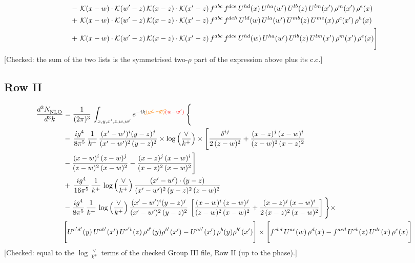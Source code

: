 \documentclass[9pt]{article}
\numberwithin{equation}{section}
\begin{document}
\begin{align}
&-\,\mathcal{K}(x-w)\cdot\mathcal{K}(w'-z)\,\mathcal{K}(x-z)\cdot\mathcal{K}(x'-z)\,f^{abc}\,f^{dce}\,U^{hd}(x)\,U^{ha}(w')\,U^{lb}(z)\,U^{lm}(x')\,\rho^{m}(x')\,\rho^{e}(x)\notag \\ 
&+\,\mathcal{K}(x-w)\cdot\mathcal{K}(w'-z)\,\mathcal{K}(x-z)\cdot\mathcal{K}(x'-z)\,f^{abc}\,f^{deh}\,U^{ld}(w)\,U^{la}(w')\,U^{mb}(z)\,U^{me}(x)\,\rho^{c}(x')\,\rho^{h}(x)\notag \\ 
&+\,\mathcal{K}(x-w)\cdot\mathcal{K}(w'-z)\,\mathcal{K}(x-z)\cdot\mathcal{K}(x'-z)\,f^{abc}\,f^{dce}\,U^{hd}(w)\,U^{ha}(w')\,U^{lb}(z)\,U^{lm}(x')\,\rho^{m}(x')\,\rho^{e}(x)\Bigg]
\end{align} {\color{red}[Checked: the sum of the two lists is the symmetrised two-$\rho$ part of the expression above plus its c.c.]}\par\noindent 
\subsection{Row II}
\begin{align}
     \frac{d^{3}N_{\rm NLO}^{\rm}}{d^{3}k}  & =   \frac{1}{(2\pi)^{3}}\, \int_{x,y,x',z,w,w^{\prime}} e^{-ik{\color{orange}\cancel{(w^{\prime}-w)}}{\color{red}(w-w^{\prime})}}\, \Bigg\{\notag \\
& -\,\frac{ig^{4}}{8\pi^{5}}\,\frac{1}{k^{+}}\,\frac{(x'-w')^{i}(y-z)^{j}}{(x'-w')^{2}\,(y-z)^{2}}\times \log{\left(\frac{\vee}{k^{+}}\right)}\times \Bigg[\frac{\delta^{ij}}{2\,(z-w)^{2}}+\frac{(x-z)^{j}\,(z-w)^{i}}{(z-w)^{2}\,(x-z)^{2}}\notag \\ & -\frac{(x-w)^{i}\,(z-w)^{j}}{(z-w)^{2}\,(x-w)^{2}}-\frac{(x-z)^{j}\,(x-w)^{i}}{(x-z)^{2}\,(x-w)^{2}}\Bigg] \notag \\
& +\,\frac{ig^{4}}{16\pi^{5}}\,\frac{1}{k^{+}}\,\log{\left(\frac{\vee}{k^{+}}\right)}\, \frac{(x'-w')\cdot (y-z)}{(x'-w')^{2}\,(y-z)^{2}\,(z-w)^{2}} \notag \\
& -\frac{ig^{4}}{8\pi^{5}}\,\frac{1}{k^{+}}\,\log{\left(\frac{\vee}{k^{+}}\right)}\,\frac{(x'-w')^{i}(y-z)^{j}}{(x'-w')^{2}\,(y-z)^{2}}\,\left[\frac{(x-w)^{i}\,(z-w)^{j}}{(z-w)^{2}\,(x-w)^{2}}+\frac{(x-z)^{j}\,(x-w)^{i}}{2\,(x-z)^{2}\, (x-w)^{2}}\right]\Bigg\}\times \notag \\ & \Bigg[U^{c'd'}(y)\,U^{ab'}(x')\,U^{c'b}(z)\,\rho^{d'}(y)\rho^{b'}(x')-U^{ab'}(x')\,\rho^{b}(y)\rho^{b'}(x')\Bigg]\times\Bigg[f^{cbd}\,U^{ac}(w)\,\rho^{d}(x)-f^{acd}\, U^{cb}(z)\,U^{de}(x)\,\rho^{e}(x)\Bigg]
\end{align} {\color{red}[Checked: equal to the $\log\frac{\vee}{k^{+}}$ terms of the checked Group III file, Row II (up to the phase).]}\par\noindent 
\end{document}
